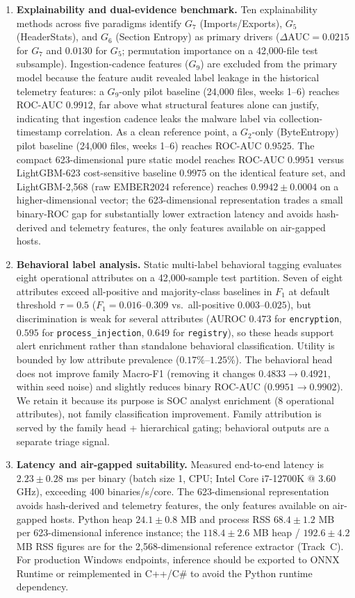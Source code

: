 \documentclass[Number]{sn-jnl}
\begin{document}
\begin{enumerate}[leftmargin=*]
\item \textbf{Explainability and dual-evidence benchmark.}
Ten explainability methods across five paradigms identify $G_7$ (Imports/Exports), $G_5$ (HeaderStats), and $G_6$ (Section Entropy) as primary drivers ($\Delta\text{AUC}=0.0215$ for $G_7$ and $0.0130$ for $G_5$; permutation importance on a 42{,}000-file test subsample). Ingestion-cadence features ($G_9$) are excluded from the primary model because the feature audit revealed label leakage in the historical telemetry features: a $G_9$-only pilot baseline (24{,}000 files, weeks 1--6) reaches ROC-AUC $0.9912$, far above what structural features alone can justify, indicating that ingestion cadence leaks the malware label via collection-timestamp correlation. As a clean reference point, a $G_2$-only (ByteEntropy) pilot baseline (24{,}000 files, weeks 1--6) reaches ROC-AUC $0.9525$. The compact 623-dimensional pure static model reaches ROC-AUC $0.9951$ versus LightGBM-623 cost-sensitive baseline $0.9975$ on the identical feature set, and LightGBM-2{,}568 (raw EMBER2024 reference) reaches $0.9942\pm0.0004$ on a higher-dimensional vector; the 623-dimensional representation trades a small binary-ROC gap for substantially lower extraction latency and avoids hash-derived and telemetry features, the only features available on air-gapped hosts.

\item \textbf{Behavioral label analysis.}
Static multi-label behavioral tagging evaluates eight operational attributes on a 42{,}000-sample test partition. Seven of eight attributes exceed all-positive and majority-class baselines in $F_1$ at default threshold $\tau=0.5$ ($F_1 = 0.016$--$0.309$ vs.\ all-positive $0.003$--$0.025$), but discrimination is weak for several attributes (AUROC $0.473$ for \texttt{encryption}, $0.595$ for \texttt{process\_injection}, $0.649$ for \texttt{registry}), so these heads support alert enrichment rather than standalone behavioral classification. Utility is bounded by low attribute prevalence ($0.17\%$--$1.25\%$). The behavioral head does not improve family Macro-F1 (removing it changes $0.4833\to0.4921$, within seed noise) and slightly reduces binary ROC-AUC ($0.9951\to0.9902$). We retain it because its purpose is SOC analyst enrichment (8 operational attributes), not family classification improvement. Family attribution is served by the family head + hierarchical gating; behavioral outputs are a separate triage signal.

\item \textbf{Latency and air-gapped suitability.}
Measured end-to-end latency is $2.23\pm0.28$ ms per binary (batch size 1, CPU; Intel Core i7-12700K @ 3.60 GHz), exceeding $400$ binaries/s/core. The 623-dimensional representation avoids hash-derived and telemetry features, the only features available on air-gapped hosts. Python heap $24.1\pm0.8$ MB and process RSS $68.4\pm1.2$ MB per 623-dimensional inference instance; the $118.4\pm2.6$ MB heap / $192.6\pm4.2$ MB RSS figures are for the 2,568-dimensional reference extractor (Track~C). For production Windows endpoints, inference should be exported to ONNX Runtime or reimplemented in C++/C\# to avoid the Python runtime dependency.
\end{enumerate}
\end{document}

